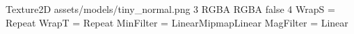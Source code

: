 Texture2D
assets/models/tiny_normal.png
3
RGBA
RGBA
false
4
WrapS = Repeat
WrapT = Repeat
MinFilter = LinearMipmapLinear
MagFilter = Linear
